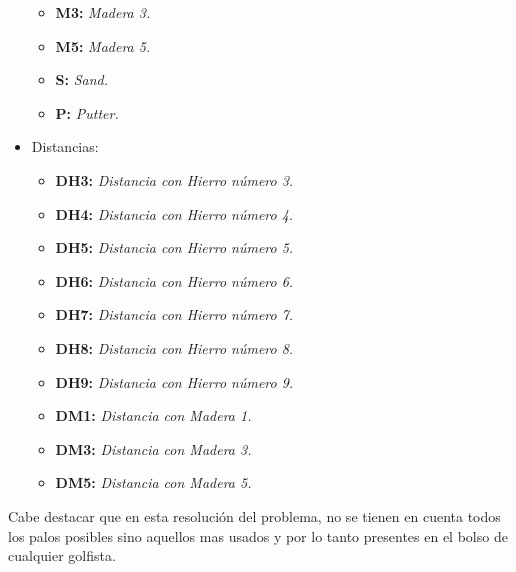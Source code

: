 \documentclass[runningheads,a4paper]{llncs}
\begin{document}
\begin{itemize}
\begin{itemize}
    \item \textbf{M3:} \textit{Madera 3.}

    \item \textbf{M5:} \textit{Madera 5.}

    \item \textbf{S:} \textit{Sand.}

    \item \textbf{P:} \textit{Putter.}\\

  \end{itemize}

  \item Distancias:
  \\

  \begin{itemize}

    \item \textbf{DH3:} \textit{Distancia con Hierro número 3.}

    \item \textbf{DH4:} \textit{Distancia con Hierro número 4.}

    \item \textbf{DH5:} \textit{Distancia con Hierro número 5.}

    \item \textbf{DH6:} \textit{Distancia con Hierro número 6.}

    \item \textbf{DH7:} \textit{Distancia con  Hierro número 7.}

    \item \textbf{DH8:} \textit{Distancia con Hierro número 8.}

    \item \textbf{DH9:} \textit{Distancia con Hierro número 9.}

    \item \textbf{DM1:} \textit{Distancia con Madera 1.}

    \item \textbf{DM3:} \textit{Distancia con Madera 3.}

    \item \textbf{DM5:} \textit{Distancia con Madera 5.}

   \end{itemize}

\end{itemize}

  Cabe destacar que en esta resolución del problema, no se tienen en cuenta todos
  los palos posibles sino aquellos mas usados y por lo tanto presentes en el
  bolso de cualquier golfista.\\
\end{document}
